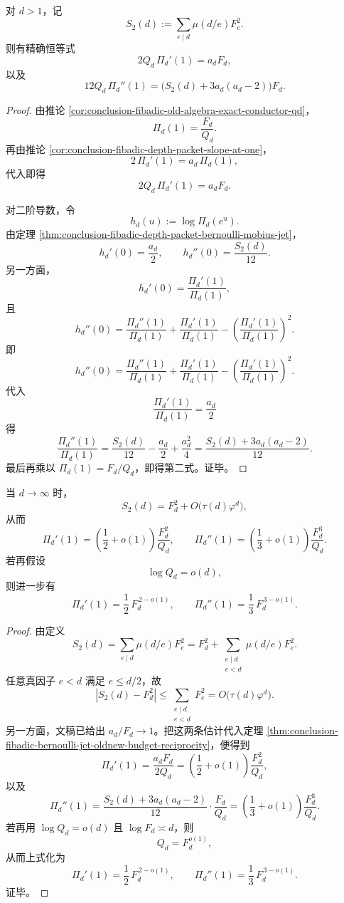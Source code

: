 \begin{theorem}\label{thm:conclusion-fibadic-bernoulli-jet-oldnew-budget-reciprocity}
对 \(d>1\)，记
\[
S_2(d):=\sum_{e\mid d}\mu(d/e)F_e^2.
\]
则有精确恒等式
\[
2Q_d\,\Pi_d'(1)=a_dF_d,
\]
以及
\[
12Q_d\,\Pi_d''(1)
=
\bigl(S_2(d)+3a_d(a_d-2)\bigr)F_d.
\]
\end{theorem}
\begin{proof}
由推论 \ref{cor:conclusion-fibadic-old-algebra-exact-conductor-qd}，
\[
\Pi_d(1)=\frac{F_d}{Q_d}.
\]
再由推论 \ref{cor:conclusion-fibadic-depth-packet-slope-at-one}，
\[
2\,\Pi_d'(1)=a_d\,\Pi_d(1),
\]
代入即得
\[
2Q_d\,\Pi_d'(1)=a_dF_d.
\]

对二阶导数，令
\[
h_d(u):=\log \Pi_d(e^u).
\]
由定理 \ref{thm:conclusion-fibadic-depth-packet-bernoulli-mobius-jet}，
\[
h_d'(0)=\frac{a_d}{2},
\qquad
h_d''(0)=\frac{S_2(d)}{12}.
\]
另一方面，
\[
h_d'(0)=\frac{\Pi_d'(1)}{\Pi_d(1)},
\]
且
\[
h_d''(0)
=
\frac{\Pi_d''(1)}{\Pi_d(1)}
+\frac{\Pi_d'(1)}{\Pi_d(1)}
-\left(\frac{\Pi_d'(1)}{\Pi_d(1)}\right)^2.
\]
即
\[
h_d''(0)
=
\frac{\Pi_d''(1)}{\Pi_d(1)}
+\frac{\Pi_d'(1)}{\Pi_d(1)}
-\left(\frac{\Pi_d'(1)}{\Pi_d(1)}\right)^2.
\]
代入
\[
\frac{\Pi_d'(1)}{\Pi_d(1)}=\frac{a_d}{2}
\]
得
\[
\frac{\Pi_d''(1)}{\Pi_d(1)}
=
\frac{S_2(d)}{12}-\frac{a_d}{2}+\frac{a_d^2}{4}
=
\frac{S_2(d)+3a_d(a_d-2)}{12}.
\]
最后再乘以 \(\Pi_d(1)=F_d/Q_d\)，即得第二式。证毕。
\end{proof}

\begin{proposition}\label{prop:conclusion-fibadic-newpacket-jet-high-order-growth}
当 \(d\to\infty\) 时，
\[
S_2(d)=F_d^2+O\!\bigl(\tau(d)\varphi^d\bigr),
\]
从而
\[
\Pi_d'(1)=\left(\frac12+o(1)\right)\frac{F_d^2}{Q_d},
\qquad
\Pi_d''(1)=\left(\frac13+o(1)\right)\frac{F_d^3}{Q_d}.
\]
若再假设
\[
\log Q_d=o(d),
\]
则进一步有
\[
\Pi_d'(1)=\frac12\,F_d^{\,2-o(1)},
\qquad
\Pi_d''(1)=\frac13\,F_d^{\,3-o(1)}.
\]
\end{proposition}
\begin{proof}
由定义
\[
S_2(d)=\sum_{e\mid d}\mu(d/e)F_e^2
=
F_d^2+\sum_{\substack{e\mid d\\ e<d}}\mu(d/e)F_e^2.
\]
任意真因子 \(e<d\) 满足 \(e\le d/2\)，故
\[
\left|S_2(d)-F_d^2\right|
\le
\sum_{\substack{e\mid d\\ e<d}}F_e^2
=
O\!\bigl(\tau(d)\varphi^d\bigr).
\]
另一方面，文稿已给出 \(a_d/F_d\to 1\)。把这两条估计代入定理 \ref{thm:conclusion-fibadic-bernoulli-jet-oldnew-budget-reciprocity}，便得到
\[
\Pi_d'(1)=\frac{a_dF_d}{2Q_d}
=
\left(\frac12+o(1)\right)\frac{F_d^2}{Q_d},
\]
以及
\[
\Pi_d''(1)
=
\frac{S_2(d)+3a_d(a_d-2)}{12}\cdot \frac{F_d}{Q_d}
=
\left(\frac13+o(1)\right)\frac{F_d^3}{Q_d}.
\]
若再用 \(\log Q_d=o(d)\) 且 \(\log F_d\asymp d\)，则
\[
Q_d=F_d^{o(1)},
\]
从而上式化为
\[
\Pi_d'(1)=\frac12\,F_d^{\,2-o(1)},
\qquad
\Pi_d''(1)=\frac13\,F_d^{\,3-o(1)}.
\]
证毕。
\end{proof}

